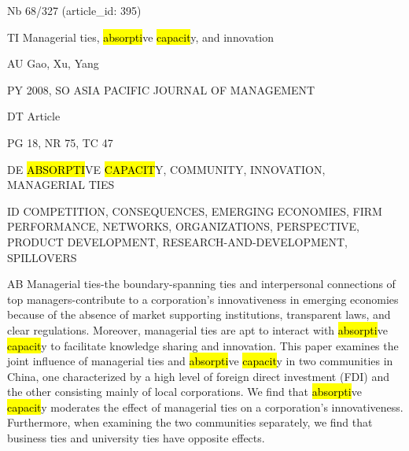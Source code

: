 \documentclass[a4paper]{article}
\begin{document}
\vspace*{-2cm}
Nb \tabto{0cm}68/327 (article\_id: 395)\par
TI \tabto{0cm}Managerial ties, \hl{absorpti}ve \hl{capacit}y, and innovation\par
AU \tabto{0cm}Gao, Xu, Yang\par
PY \tabto{0cm}2008, SO ASIA PACIFIC JOURNAL OF MANAGEMENT\par
DT \tabto{0cm}Article\par
PG \tabto{0cm}18, NR 75, TC 47\par
DE \tabto{0cm}\hl{ABSORPTI}VE \hl{CAPACIT}Y, COMMUNITY, INNOVATION, MANAGERIAL TIES\par
ID \tabto{0cm}COMPETITION, CONSEQUENCES, EMERGING ECONOMIES, FIRM PERFORMANCE, NETWORKS, ORGANIZATIONS, PERSPECTIVE, PRODUCT DEVELOPMENT, RESEARCH-AND-DEVELOPMENT, SPILLOVERS\par
AB \tabto{0cm}Managerial ties-the boundary-spanning ties and interpersonal connections of top managers-contribute to a corporation's innovativeness in emerging economies because of the absence of market supporting institutions, transparent laws, and clear regulations. Moreover, managerial ties are apt to interact with \hl{absorpti}ve \hl{capacit}y to facilitate knowledge sharing and innovation. This paper examines the joint influence of managerial ties and \hl{absorpti}ve \hl{capacit}y in two communities in China, one characterized by a high level of foreign direct investment (FDI) and the other consisting mainly of local corporations. We find that \hl{absorpti}ve \hl{capacit}y moderates the effect of managerial ties on a corporation's innovativeness. Furthermore, when examining the two communities separately, we find that business ties and university ties have opposite effects.\par
\clearpage
\end{document}
